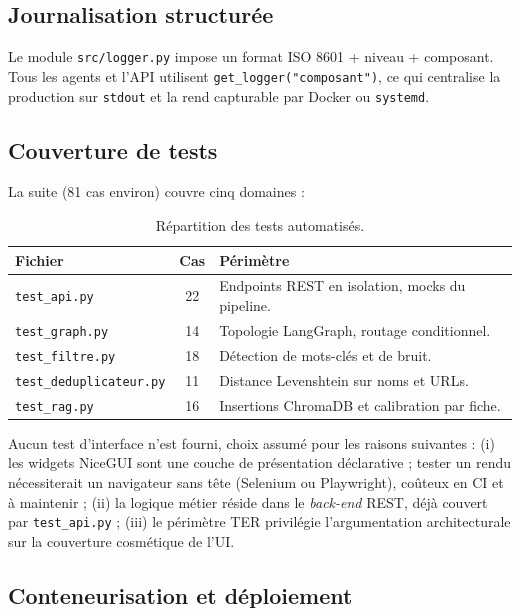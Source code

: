 \subsection{Journalisation structurée}

Le module \texttt{src/logger.py} impose un format ISO 8601 + niveau + composant. Tous les agents et l'API utilisent \texttt{get\_logger("composant")}, ce qui centralise la production sur \texttt{stdout} et la rend capturable par Docker ou \texttt{systemd}.

\subsection{Couverture de tests}

La suite (81 cas environ) couvre cinq domaines :

\begin{table}[H]
\centering
\small
\begin{tabular}{@{}lcl@{}}
\toprule
\textbf{Fichier} & \textbf{Cas} & \textbf{Périmètre} \\
\midrule
\texttt{test\_api.py}          & 22 & Endpoints REST en isolation, mocks du pipeline. \\
\texttt{test\_graph.py}        & 14 & Topologie LangGraph, routage conditionnel. \\
\texttt{test\_filtre.py}       & 18 & Détection de mots-clés et de bruit. \\
\texttt{test\_deduplicateur.py} & 11 & Distance Levenshtein sur noms et URLs. \\
\texttt{test\_rag.py}          & 16 & Insertions ChromaDB et calibration par fiche. \\
\bottomrule
\end{tabular}
\caption{Répartition des tests automatisés.}
\end{table}

Aucun test d'interface n'est fourni, choix assumé pour les raisons suivantes : (i) les widgets NiceGUI sont une couche de présentation déclarative ; tester un rendu nécessiterait un navigateur sans tête (Selenium ou Playwright), coûteux en CI et à maintenir ; (ii) la logique métier réside dans le \textit{back-end} REST, déjà couvert par \texttt{test\_api.py} ; (iii) le périmètre TER privilégie l'argumentation architecturale sur la couverture cosmétique de l'UI.

\subsection{Conteneurisation et déploiement}

